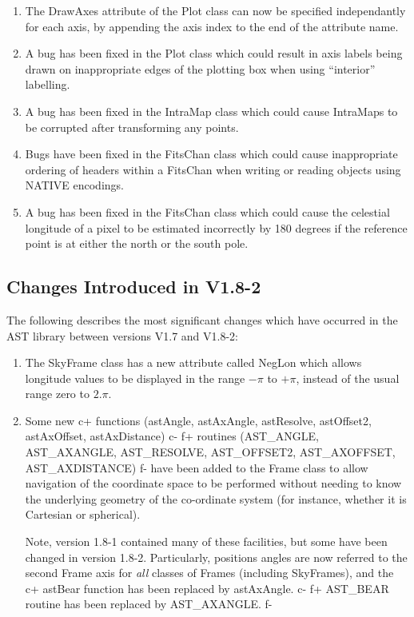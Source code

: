 \documentclass[twoside,11pt]{starlink}
\begin{document}
\begin{enumerate}
\item The DrawAxes attribute of the Plot class can now be specified
independantly for each axis, by appending the axis index to the
end of the attribute name.

\item A bug has been fixed in the Plot class which could result in axis
labels being drawn on inappropriate edges of the plotting box when using
``interior'' labelling.

\item A bug has been fixed in the IntraMap class which could cause IntraMaps
to be corrupted after transforming any points.

\item Bugs have been fixed in the FitsChan class which could cause
inappropriate ordering of headers within a FitsChan when writing or
reading objects using NATIVE encodings.

\item A bug has been fixed in the FitsChan class which could cause the
celestial longitude of a pixel to be estimated incorrectly by 180 degrees
if the reference point is at either the north or the south pole.

\end{enumerate}


\subsection{Changes Introduced in V1.8-2}

The following describes the most significant changes which have
occurred in the AST library between versions V1.7 and V1.8-2:

\begin{enumerate}

\item The SkyFrame class has a new attribute called NegLon which allows
   longitude values to be displayed in the range $-\pi$ to $+\pi$, instead
   of the usual range zero to $2.\pi$.

\item Some new
c+
functions (astAngle, astAxAngle, astResolve, astOffset2, astAxOffset,
astAxDistance)
c-
f+
routines (AST\_ANGLE, AST\_AXANGLE, AST\_RESOLVE, AST\_OFFSET2, AST\_AXOFFSET,
AST\_AXDISTANCE)
f-
have been added to the Frame class to allow navigation of the coordinate space
to be performed without needing to know the underlying geometry
of the co-ordinate system (for instance, whether it is Cartesian or
spherical).

Note, version 1.8-1 contained many of these facilities, but
some have been changed in version 1.8-2. Particularly, positions angles
are now referred to the second Frame axis for \emph{all} classes of Frames
(including SkyFrames), and the
c+
astBear function has been replaced by astAxAngle.
c-
f+
AST\_BEAR routine has been replaced by AST\_AXANGLE.
f-

\end{enumerate}
\end{document}
